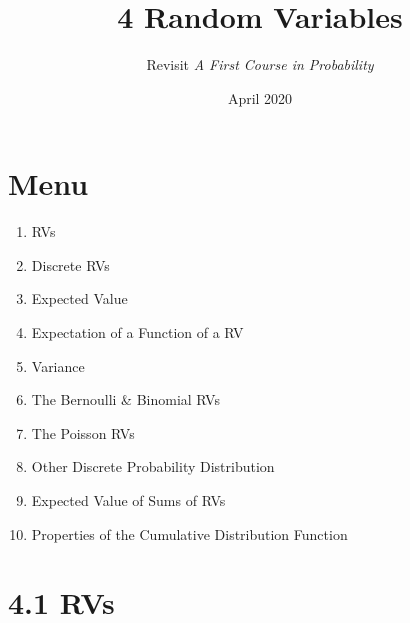 \documentclass{article}
\title{4 Random Variables}
\author{Revisit \textit{A First Course in Probability}}
\date{April 2020}
\begin{document}
\maketitle

\section*{Menu}
\begin{enumerate}
\item  RVs
\item  Discrete RVs
\item  Expected Value
\item  Expectation of a Function of a RV
\item  Variance
\item  The Bernoulli & Binomial RVs
\item  The Poisson RVs 
\item  Other Discrete Probability Distribution
\item  Expected Value of Sums of RVs
\item  Properties of the Cumulative Distribution Function 
\end{enumerate}


\section*{4.1 RVs}






\end{document}

